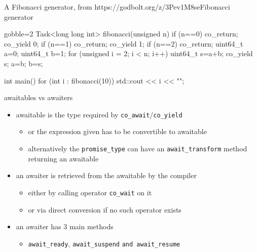 \begin{frame}[fragile]
  \begin{exampleblockGB}{A Fibonacci generator, from }{https://godbolt.org/z/3Pev1M8se}{Fibonacci generator}
    \scriptsize
     \begin{cppcode*}{gobble=2}
       Task<long long int> fibonacci(unsigned n) {
         if (n==0) co_return;
         co_yield 0;
         if (n==1) co_return;
         co_yield 1;
         if (n==2) co_return;
         uint64_t a=0;
         uint64_t b=1;
         for (unsigned i = 2; i < n; i++) {
           uint64_t s=a+b;
           co_yield s;
           a=b;
           b=s;
         }
       }

       int main() {
         for (int i : fibonacci(10)) {
           std::cout << i << "\n";
         }
       }
    \end{cppcode*}
  \end{exampleblockGB}
\end{frame}

\begin{frame}
  \begin{block}{awaitables vs awaiters}
    \begin{itemize}
    \item awaitable is the type required by \texttt{co_await}/\texttt{co_yield}
      \begin{itemize}
      \item or the expression given has to be convertible to awaitable
      \item alternatively the \texttt{promise_type} can have an \texttt{await_transform} method returning an awaitable
      \end{itemize}
    \item an awaiter is retrieved from the awaitable by the compiler
      \begin{itemize}
      \item either by calling operator \texttt{co_wait} on it
      \item or via direct conversion if no such operator exists
      \end{itemize}
    \item an awaiter has 3 main methods
      \begin{itemize}
      \item \texttt{await_ready}, \texttt{await_suspend} \texttt{and await_resume}
      \end{itemize}
    \end{itemize}
  \end{block}
\end{frame}

